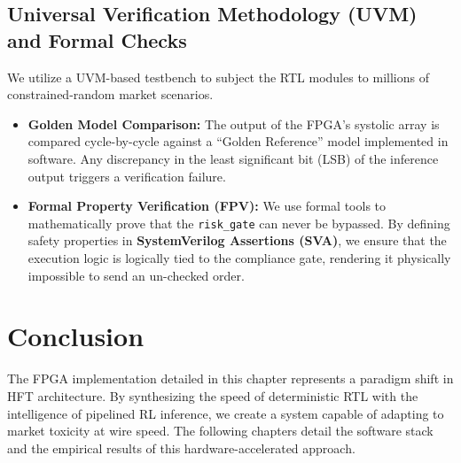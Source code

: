 \subsection{Universal Verification Methodology (UVM) and Formal Checks}
We utilize a UVM-based testbench to subject the RTL modules to millions of constrained-random market scenarios.
\begin{itemize}
    \item \textbf{Golden Model Comparison:} The output of the FPGA's systolic array is compared cycle-by-cycle against a ``Golden Reference'' model implemented in software. Any discrepancy in the least significant bit (LSB) of the inference output triggers a verification failure.
    \item \textbf{Formal Property Verification (FPV):} We use formal tools to mathematically prove that the \texttt{risk\_gate} can never be bypassed. By defining safety properties in \textbf{SystemVerilog Assertions (SVA)}, we ensure that the execution logic is logically tied to the compliance gate, rendering it physically impossible to send an un-checked order.
\end{itemize}

\section{Conclusion}
The FPGA implementation detailed in this chapter represents a paradigm shift in HFT architecture. By synthesizing the speed of deterministic RTL with the intelligence of pipelined RL inference, we create a system capable of adapting to market toxicity at wire speed. The following chapters detail the software stack and the empirical results of this hardware-accelerated approach.
